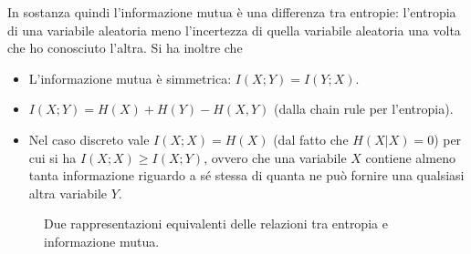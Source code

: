 In sostanza quindi l’informazione mutua è una differenza tra entropie: l’entropia di una variabile aleatoria meno l’incertezza di quella variabile aleatoria una volta che ho conosciuto l'altra. Si ha inoltre che
\begin{itemize}
    \item L'informazione mutua \`e simmetrica: $I(X;Y) = I(Y;X)$.
    \item $I(X;Y) = H(X) + H(Y) - H(X,Y)$ (dalla chain rule per l'entropia).
    \item Nel caso discreto vale $I(X;X) = H(X)$ (dal fatto che $H(X|X) = 0$) per cui si ha $I(X;X) \geq I(X;Y)$, ovvero che una variabile $X$ contiene almeno tanta informazione riguardo a sé stessa di quanta ne può fornire una qualsiasi altra variabile $Y$.
\end{itemize}
\begin{figure}[!tbp]
  \centering
  \hspace{25pt}
  \caption{Due rappresentazioni equivalenti delle relazioni tra entropia e informazione mutua.}
\end{figure}

